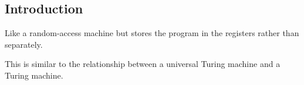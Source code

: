 
\subsection{Introduction}

Like a random-access machine but stores the program in the registers rather than separately.

This is similar to the relationship between a universal Turing machine and a Turing machine.

